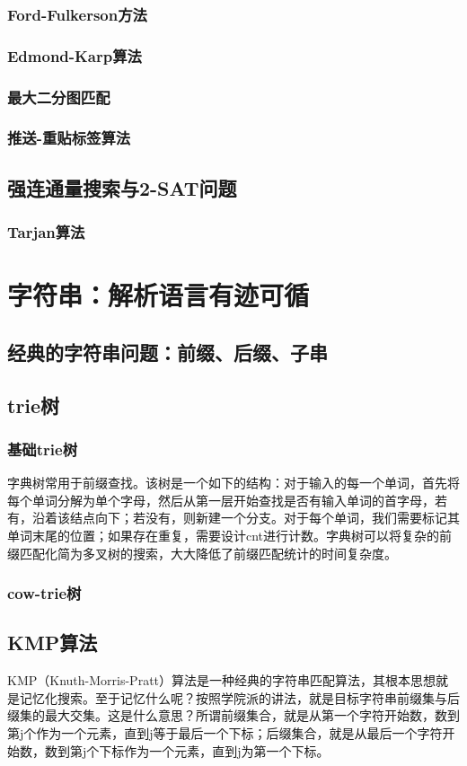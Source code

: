\documentclass[12pt,a4paper,UTF16]{ctexbook}
\theoremstyle{plain}
\begin{document}
\subsection{Ford-Fulkerson方法}
\subsection{Edmond-Karp算法}
\subsection{最大二分图匹配}
\subsection{推送-重贴标签算法}
\section{强连通量搜索与2-SAT问题}
\subsection{Tarjan算法}

\chapter{字符串：解析语言有迹可循}
\section{经典的字符串问题：前缀、后缀、子串}
\section{trie树}
\subsection{基础trie树}
字典树常用于前缀查找。该树是一个如下的结构：对于输入的每一个单词，首先将每个单词分解为单个字母，然后从第一层开始查找是否有输入单词的首字母，若有，沿着该结点向下；若没有，则新建一个分支。对于每个单词，我们需要标记其单词末尾的位置；如果存在重复，需要设计cnt进行计数。字典树可以将复杂的前缀匹配化简为多叉树的搜索，大大降低了前缀匹配统计的时间复杂度。
\subsection{cow-trie树}
\section{KMP算法}
KMP（Knuth-Morris-Pratt）算法是一种经典的字符串匹配算法，其根本思想就是记忆化搜索。至于记忆什么呢？按照学院派的讲法，就是目标字符串前缀集与后缀集的最大交集。这是什么意思？所谓前缀集合，就是从第一个字符开始数，数到第j个作为一个元素，直到j等于最后一个下标；后缀集合，就是从最后一个字符开始数，数到第j个下标作为一个元素，直到j为第一个下标。
\end{document}
